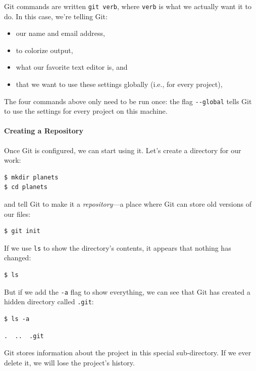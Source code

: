 \documentclass[]{book}
\newcommand{\gdef}[2]{\emph{#2}}
\begin{document}
Git commands are written \texttt{git verb}, where \texttt{verb} is what
we actually want it to do. In this case, we're telling Git:

\begin{itemize}
\item
  our name and email address,
\item
  to colorize output,
\item
  what our favorite text editor is, and
\item
  that we want to use these settings globally (i.e., for every project),
\end{itemize}

The four commands above only need to be run once: the flag
\texttt{-{}-global} tells Git to use the settings for every project on
this machine.

\mbox{}\paragraph{Creating a Repository}

Once Git is configured, we can start using it. Let's create a directory
for our work:

\begin{verbatim}
$ mkdir planets
$ cd planets
\end{verbatim}

and tell Git to make it a \gdef{g:repository}{repository}---a place
where Git can store old versions of our files:

\begin{verbatim}
$ git init
\end{verbatim}

If we use \texttt{ls} to show the directory's contents, it appears that
nothing has changed:

\begin{verbatim}
$ ls
\end{verbatim}

But if we add the \texttt{-a} flag to show everything, we can see that
Git has created a hidden directory called \texttt{.git}:

\begin{verbatim}
$ ls -a
\end{verbatim}

\begin{verbatim}
.  ..  .git
\end{verbatim}

Git stores information about the project in this special sub-directory.
If we ever delete it, we will lose the project's history.
\end{document}
